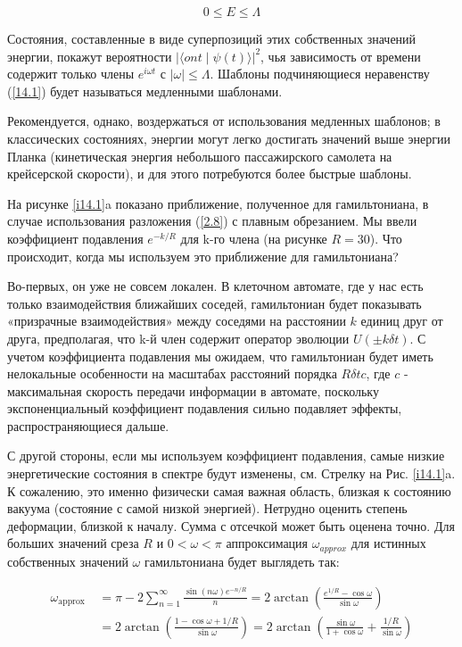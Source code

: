 \documentclass[main.tex]{subfiles}
\begin{document}
\begin{equation}\label{14.1}
	0\le E\le\Lambda
\end{equation}

Состояния, составленные в виде суперпозиций этих собственных значений энергии, покажут вероятности $|\langle ont\mid\psi(t)\rangle|^2$, чья зависимость от времени содержит только члены $e^{i\omega t}$ с $|\omega|\le\Lambda$. Шаблоны подчиняющиеся неравенству (\ref{14.1}) будет называться медленными шаблонами.

Рекомендуется, однако, воздержаться от использования медленных шаблонов; в классических состояниях, энергии могут легко достигать значений выше энергии Планка (кинетическая энергия небольшого пассажирского самолета на крейсерской скорости), и для этого потребуются более быстрые шаблоны.

На рисунке \ref{i14.1}a показано приближение, полученное для гамильтониана, в случае использования разложения (\ref{2.8}) с плавным обрезанием. Мы ввели коэффициент подавления $e^{-k/R}$ для k-го члена (на рисунке $R = 30$). Что происходит, когда мы используем это приближение для гамильтониана?

Во-первых, он уже не совсем локален. В клеточном автомате, где у нас есть только взаимодействия ближайших соседей, гамильтониан будет показывать «призрачные взаимодействия» между соседями на расстоянии $k$ единиц друг от друга, предполагая, что k-й член содержит оператор эволюции $U (\pm k\delta t)$. С учетом коэффициента подавления мы ожидаем, что гамильтониан будет иметь нелокальные особенности на масштабах расстояний порядка $R\delta tc$, где $c$ - максимальная скорость передачи информации в автомате, поскольку экспоненциальный коэффициент подавления сильно подавляет эффекты, распространяющиеся дальше.

С другой стороны, если мы используем коэффициент подавления, самые низкие энергетические состояния в спектре будут изменены, см. Стрелку на Рис. \ref{i14.1}a. К сожалению, это именно физически самая важная область, близкая к состоянию вакуума (состояние с самой низкой энергией). Нетрудно оценить степень деформации, близкой к началу. Сумма с отсечкой может быть оценена точно. Для больших значений среза $R$ и $0 <\omega <\pi$ аппроксимация $\omega_{approx}$ для истинных собственных значений $\omega$ гамильтониана будет выглядеть так:

\begin{equation}\label{14.2}
	\begin{aligned} \omega_{\text {approx }} &=\pi-2 \sum_{n=1}^{\infty} \frac{\sin (n \omega) e^{-n / R}}{n}=2 \arctan \left(\frac{e^{1 / R}-\cos \omega}{\sin \omega}\right) \\ &=2 \arctan \left(\frac{1-\cos \omega+1 / R}{\sin \omega}\right)=2 \arctan \left(\frac{\sin \omega}{1+\cos \omega}+\frac{1 / R}{\sin \omega}\right) \end{aligned}
\end{equation}
\end{document}
